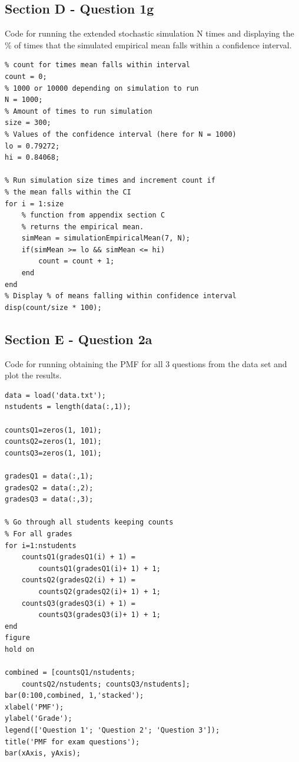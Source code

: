 \documentclass[10pt]{article}
\begin{document}
\subsection*{Section D - Question 1g}
Code for running the extended stochastic simulation N times and
displaying the \% of times that the simulated empirical mean falls within a
confidence interval.
\begin{lstlisting}
% count for times mean falls within interval
count = 0;
% 1000 or 10000 depending on simulation to run
N = 1000;
% Amount of times to run simulation
size = 300;
% Values of the confidence interval (here for N = 1000)
lo = 0.79272;
hi = 0.84068;

% Run simulation size times and increment count if 
% the mean falls within the CI
for i = 1:size
    % function from appendix section C
    % returns the empirical mean.
    simMean = simulationEmpiricalMean(7, N);
    if(simMean >= lo && simMean <= hi)
        count = count + 1;
    end
end
% Display % of means falling within confidence interval
disp(count/size * 100);
\end{lstlisting}

\subsection*{Section E - Question 2a}
Code for running obtaining the PMF for all 3 questions from the data set
and plot the results.
\begin{lstlisting}
data = load('data.txt');
nstudents = length(data(:,1));

countsQ1=zeros(1, 101);
countsQ2=zeros(1, 101);
countsQ3=zeros(1, 101);

gradesQ1 = data(:,1);
gradesQ2 = data(:,2);
gradesQ3 = data(:,3);

% Go through all students keeping counts
% For all grades
for i=1:nstudents
    countsQ1(gradesQ1(i) + 1) = 
        countsQ1(gradesQ1(i)+ 1) + 1; 
    countsQ2(gradesQ2(i) + 1) = 
        countsQ2(gradesQ2(i)+ 1) + 1; 
    countsQ3(gradesQ3(i) + 1) = 
        countsQ3(gradesQ3(i)+ 1) + 1; 
end
figure
hold on

combined = [countsQ1/nstudents; 
    countsQ2/nstudents; countsQ3/nstudents];
bar(0:100,combined, 1,'stacked');
xlabel('PMF');
ylabel('Grade');
legend(['Question 1'; 'Question 2'; 'Question 3']);
title('PMF for exam questions');
bar(xAxis, yAxis);
    
\end{lstlisting}
\end{document}

